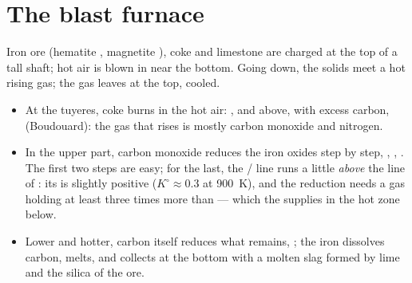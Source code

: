 \section{The blast furnace}

Iron ore (hematite , magnetite ), coke and limestone are
charged at the top of a tall shaft; hot air is blown in
near the bottom. Going down, the solids meet a hot rising gas; the gas leaves
at the top, cooled.
\begin{itemize}
  \item At the tuyeres, coke burns in the hot air: , and
        above, with excess carbon,  (Boudouard): the gas
        that rises is mostly carbon monoxide and nitrogen.
  \item In the upper part, carbon monoxide reduces the iron oxides step by
        step, , ,
        . The first two steps are easy; for the last,
        the / line runs a little \textit{above} the line of
        : its  is slightly positive
        ($K^\circ \approx 0.3$ at \qty{900}{K}), and the reduction needs a gas
        holding at least three times more  than  --- which the
         supplies in the hot zone below.
  \item Lower and hotter, carbon itself reduces what remains, ; the iron dissolves carbon, melts, and collects at the bottom
        with a molten slag formed by lime and the silica of the ore.
\end{itemize}

